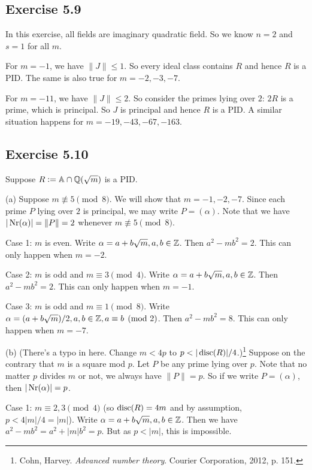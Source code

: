 \documentclass[../Marcus.tex]{subfiles}
\begin{document}
\subsection*{Exercise 5.9}

In this exercise, all fields are imaginary quadratic field. So we know $n=2$ and $s=1$ for all $m$.

For $m=-1$, we have $\|J\| \leq 1$. So every ideal class contains $R$ and hence $R$ is a PID. The same is also true for $m=-2,-3,-7$.

For $m=-11$, we have $\|J\| \leq 2$. So consider the primes lying over $2$: $2R$ is a prime, which is principal. So $J$ is principal and hence $R$ is a PID. A similar situation happens for $m=-19,-43,-67,-163$.

\subsection*{Exercise 5.10}

Suppose $R:=\mathbb{A}\cap\mathbb{Q}(\sqrt{m})$ is a PID.

(a) Suppose $m\not\equiv 5 \pmod{8}$. We will show that $m=-1,-2,-7$. Since each prime $P$ lying over $2$ is principal, we may write $P=(\alpha)$. Note that we have $|\operatorname{Nr}(\alpha)| = \|P\| = 2$ whenever $m\not\equiv 5 \pmod{8}$.

Case 1: $m$ is even. Write $\alpha = a+b\sqrt{m},a,b\in\mathbb{Z}$. Then $a^2 - mb^2 = 2$. This can only happen when $m=-2$.

Case 2: $m$ is odd and $m\equiv3 \pmod{4}$. Write $\alpha = a+b\sqrt{m},a,b\in\mathbb{Z}$. Then $a^2 - mb^2 = 2$. This can only happen when $m=-1$.

Case 3: $m$ is odd and $m\equiv1 \pmod{8}$. Write $\alpha = (a+b\sqrt{m})/2,a,b\in\mathbb{Z},a \equiv b \pmod{2}$. Then $a^2 - mb^2 = 8$. This can only happen when $m=-7$.

(b) {\color{red}(There's a typo in here. Change $m<4p$ to $p<|\disc(R)|/4$.)}\footnote{Cohn, Harvey. \textit{Advanced number theory}. Courier Corporation, 2012, p. 151.} Suppose on the contrary that $m$ is a square mod $p$. Let $P$ be any prime lying over $p$. Note that no matter $p$ divides $m$ or not, we always have $\|P\|=p$. So if we write $P=(\alpha)$, then $|\operatorname{Nr}(\alpha)| = p$.

Case 1: $m\equiv2,3 \pmod{4}$ (so $\operatorname{disc}(R)=4m$ and by assumption, $p<4|m|/4 = |m|$). Write $\alpha = a+b\sqrt{m},a,b\in\mathbb{Z}$. Then we have $a^2 - mb^2 = a^2 + |m|b^2 = p$. But as $p<|m|$, this is impossible.
\end{document}
